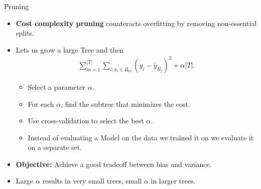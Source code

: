 \documentclass[10pt]{beamer}
\begin{document}
\begin{frame}{Pruning}
    \begin{itemize}
        \item \textbf{Cost complexity pruning} counteracts overfitting by removing non-essential splits.
        \item Lets us grow a large Tree and then 
        \begin{align*}
            \sum_{m=1}^{|T|} \sum_{i: x_i \in R_m} (y_i - \hat{y}_{R_j})^2 + \alpha|T|.
        \end{align*}
    \begin{itemize}
        \item Select a parameter \( \alpha \).
        \item For each \( \alpha \), find the subtree that minimizes the cost.
           \item Use cross-validation to select the best \( \alpha \).
         \item Instead of evaluating a Model on the data we trained it on we evaluate it on a separate set.
        \end{itemize}
        \item \textbf{Objective:} Achieve a good tradeoff between bias and variance.
       \item Large \( \alpha \) results in very small trees, small \( \alpha \) in larger trees.
    \end{itemize}
\end{frame}
\end{document}
